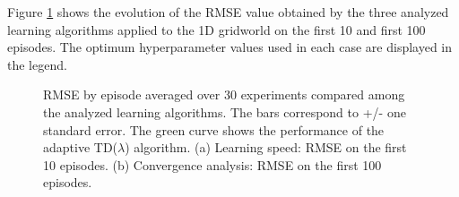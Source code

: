 \documentclass[11pt,A4paper]{article}
\begin{document}
Figure \ref{fig:RMSE by episode} shows the evolution of the RMSE value obtained by the three analyzed learning algorithms applied to the 1D gridworld on the first 10 and first 100 episodes. The optimum hyperparameter values used in each case are displayed in the legend.

\begin{figure}[h!]
	\centering

	\caption{RMSE by episode averaged over 30 experiments compared among the analyzed learning algorithms. The bars correspond to +/- one standard error. The green curve shows the performance of the adaptive TD($\lambda$) algorithm.  (a) Learning speed: RMSE on the first 10 episodes. (b) Convergence analysis: RMSE on the first 100 episodes.}
	\label{fig:RMSE by episode}
\end{figure}
\end{document}
